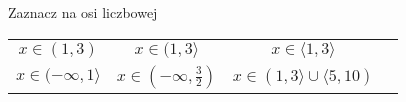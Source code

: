 \documentclass[a4paper,12pt,leqno,fleqn]{article}
\begin{document}
\newpage
Zaznacz na osi liczbowej

\begin{tabularx}{\linewidth}{@{}XX@{}XX@{}}

  \begin{equation}
    x\in(1,3)
  \end{equation}
&
  \begin{equation}
    x\in(1,3\rangle
  \end{equation}
&
  \begin{equation}
    x\in\langle1,3\rangle
  \end{equation}
\\
  \begin{equation}
    x\in(-\infty,1\rangle
  \end{equation}
&
  \begin{equation}
    x\in(-\infty,\tfrac{3}{2})
  \end{equation}
&
  \begin{equation}
    x\in(1,3\rangle\cup\langle5,10)
  \end{equation}
\\
\end{tabularx}
\end{document}
